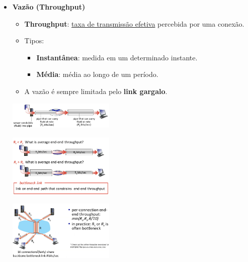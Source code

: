 \begin{itemize}[left=0.5cm, align=left, nosep]
            \item \textbf{Vazão (Throughput)}
            \begin{itemize}[left=0.5cm, nosep, label=$\hookrightarrow$]
                \item \textbf{Throughput}: \underline{taxa de transmissão efetiva} percebida por uma conexão.
                \item Tipos:
                \begin{itemize}[left=0.5cm, nosep, label=$-$]
                    \item \textbf{Instantânea}: medida em um determinado instante.
                    \item \textbf{Média}: média ao longo de um período.
                \end{itemize}
                \item A vazão é sempre limitada pelo \textbf{link gargalo}.
            \end{itemize}
        
            \begin{center}
                \includegraphics[width=0.4\textwidth]{img/cap-01/vazao.png}
            \end{center}

            \begin{center}
                \includegraphics[width=0.4\textwidth]{img/cap-01/exemplo-vazao.png}
            \end{center}

            \begin{center}
                \includegraphics[width=0.4\textwidth]{img/cap-01/exemplo-vazao2.png}
            \end{center}
        
        \end{itemize} 
        
